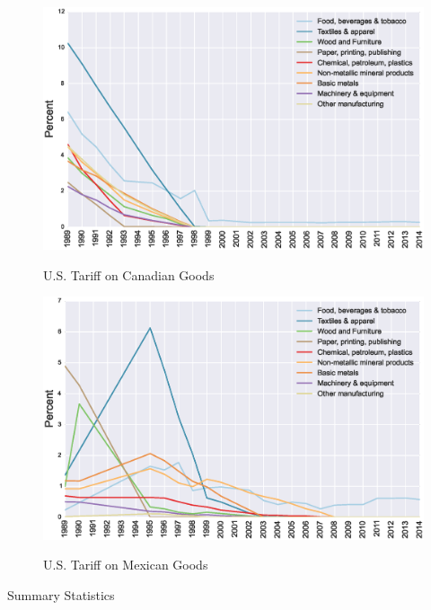 \vfill
\clearpage

\begin{figure}[h!t]\centering
\caption{\small U.S. Tariff on Canadian Goods}
\includegraphics[scale=0.5]{tau_usa_can}
\label{fig:usa_can}
\end{figure}
 
\begin{figure}[h!t]\centering
\caption{\small U.S. Tariff on Mexican Goods}
\includegraphics[scale=0.5]{tau_usa_mex}
\label{fig:usa_mex}
\end{figure}

\begin{center}
\begin{table}

\caption{Summary Statistics}
\label{tab:sumstats}
\end{table}
\end{center}



